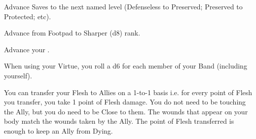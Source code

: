 \begin{multicols*}{2}

Advance  Saves to the next named level (Defenseless to Preserved; Preserved to Protected; etc).


Advance  from Footpad to Sharper (d8) rank.



Advance your  \DCUP.


When using your  Virtue, you roll a d6 for each member of your Band (including yourself).


You can transfer your Flesh to Allies on a 1-to-1 basis i.e. for every point of Flesh you transfer, you take 1 point of Flesh damage. You do not need to be touching the Ally, but you do need to be Close to them.  The wounds that appear on your body match the wounds taken by the Ally.  The point of Flesh transferred is enough to keep an Ally from Dying.

\end{multicols*}
